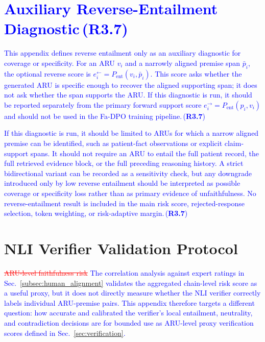 \documentclass[a4paper,fleqn,doubleblind]{cas-sc}
\DeclareRobustCommand{\deleted}[1]{\textcolor{red}{\sout{#1}}}
\DeclareRobustCommand{\added}[1]{\textcolor{blue}{#1}}
\DeclareRobustCommand{\revtag}[1]{\textcolor{blue}{\scriptsize\,(\textbf{#1})}}
\begin{document}
\section{\added{Auxiliary Reverse-Entailment Diagnostic}\revtag{R3.7}}
\label{app:reverse_entailment_diagnostic}

\added{This appendix defines reverse entailment only as an auxiliary diagnostic for coverage or specificity. For an ARU $v_i$ and a narrowly aligned premise span $\bar{p}_i$, the optional reverse score is $e_i^{\leftarrow}=P_{\text{ent}}(v_i,\bar{p}_i)$. This score asks whether the generated ARU is specific enough to recover the aligned supporting span; it does not ask whether the span supports the ARU. If this diagnostic is run, it should be reported separately from the primary forward support score $e_i^{\rightarrow}=P_{\text{ent}}(p_i,v_i)$ and should not be used in the Fa-DPO training pipeline.}\revtag{R3.7}

\added{If this diagnostic is run, it should be limited to ARUs for which a narrow aligned premise can be identified, such as patient-fact observations or explicit claim-support spans. It should not require an ARU to entail the full patient record, the full retrieved evidence block, or the full preceding reasoning history. A strict bidirectional variant can be recorded as a sensitivity check, but any downgrade introduced only by low reverse entailment should be interpreted as possible coverage or specificity loss rather than as primary evidence of unfaithfulness. No reverse-entailment result is included in the main risk score, rejected-response selection, token weighting, or risk-adaptive margin.}\revtag{R3.7}

\section{NLI Verifier Validation Protocol}
\label{app:nli_validation}

\deleted{ARU-level faithfulness risk}
\added{The correlation analysis against expert ratings in Sec.~\ref{subsec:human_alignment} validates the aggregated chain-level risk score as a useful proxy, but it does not directly measure whether the NLI verifier correctly labels individual ARU-premise pairs. This appendix therefore targets a different question: how accurate and calibrated the verifier's local entailment, neutrality, and contradiction decisions are for bounded use as ARU-level proxy verification scores defined in Sec.~\ref{sec:verification}.}
\end{document}
